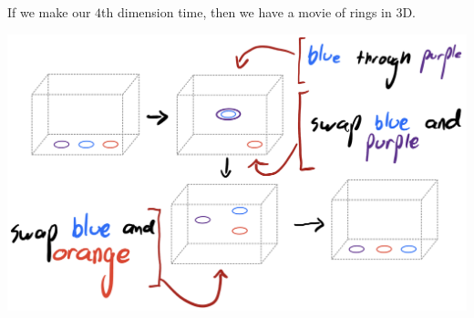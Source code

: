 \documentclass[14pt, xcolor=svgnames]{beamer}
\begin{document}
\begin{frame}
    If we make our \( 4 \)th dimension time, then we have a movie of rings in \( 3 \)D. 
    \begin{center}
        \includegraphics[width = \textwidth]{images/movie representation of a welded braid.png}
    \end{center}
\end{frame}
\end{document}
